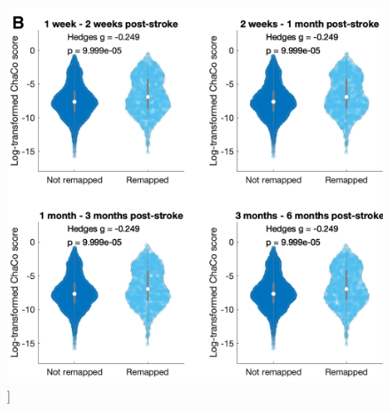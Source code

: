\documentclass[phd,tocprelim]{cornell}
\renewcommand{\caption}[1]{\singlespacing\hangcaption{#1}\normalspacing}
\begin{document}
\begin{figure}[h!]
		\ContinuedFloat
		\captionsetup{labelformat=adja-page}
    \centering
    \includegraphics[width=\textwidth]{chapter1/SupplementaryFigure17B.png}
    \caption[]{}
\end{figure}
\null
\vfill
\clearpage
\null
\vfill
\end{document}
